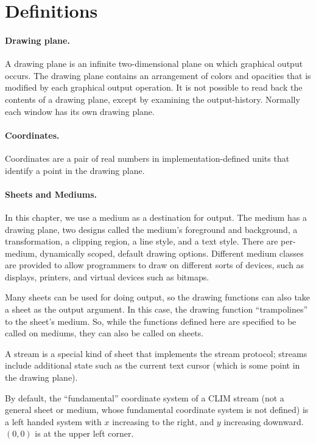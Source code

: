\section {Definitions}

\paragraph {Drawing plane.}

A drawing plane is an infinite two-dimensional plane on which graphical output
occurs.  The drawing plane contains an arrangement of colors and opacities that
is modified by each graphical output operation.  It is not possible to read back
the contents of a drawing plane, except by examining the output-history.
Normally each window has its own drawing plane.

\paragraph {Coordinates.}

Coordinates are a pair of real numbers in implementation-defined units that
identify a point in the drawing plane.

\paragraph {Sheets and Mediums.}

In this chapter, we use a medium as a destination for output.  The medium has a
drawing plane, two designs called the medium's foreground and background, a
transformation, a clipping region, a line style, and a text style.  There are
per-medium, dynamically scoped, default drawing options.  Different medium
classes are provided to allow programmers to draw on different sorts of devices,
such as displays, printers, and virtual devices such as bitmaps.

Many sheets can be used for doing output, so the drawing functions can also take
a sheet as the output argument.  In this case, the drawing function ``trampolines''
to the sheet's medium.  So, while the functions defined here are specified to be
called on mediums, they can also be called on sheets.

A stream is a special kind of sheet that implements the stream protocol; streams
include additional state such as the current text cursor (which is some point in
the drawing plane).

By default, the ``fundamental'' coordinate system of a CLIM stream (not a
general sheet or medium, whose fundamental coordinate system is not defined) is
a left handed system with $x$ increasing to the right, and $y$ increasing
downward.  $(0,0)$ is at the upper left corner.


